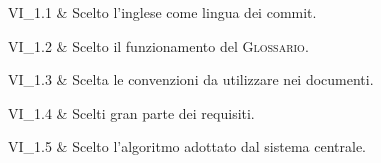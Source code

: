 VI\_1.1 & Scelto l'inglese come lingua dei commit.
		
\tabularnewline 
VI\_1.2 & Scelto il funzionamento del \textsc{Glossario}.

\tabularnewline 
VI\_1.3 & Scelta le convenzioni da utilizzare nei documenti.

\tabularnewline 
VI\_1.4 & Scelti gran parte dei requisiti.

\tabularnewline 
VI\_1.5 & Scelto l'algoritmo adottato dal sistema centrale.
	
	
